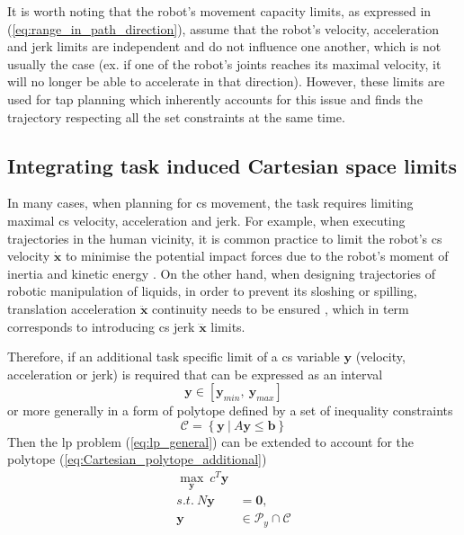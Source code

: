 It is worth noting that the robot's movement capacity limits, as expressed in (\ref{eq:range_in_path_direction}), assume that the robot's velocity, acceleration and jerk limits are independent and do not influence one another, which is not usually the case (ex. if one of the robot's joints reaches its maximal velocity, it will no longer be able to accelerate in that direction). However, these limits are used for \gls{tap} planning which inherently accounts for this issue and finds the trajectory respecting all the set constraints at the same time. 

\subsection{Integrating task induced Cartesian space limits}

In many cases, when planning for \gls{cs} movement, the task requires limiting maximal \gls{cs} velocity, acceleration and jerk. For example, when executing trajectories in the human vicinity, it is common practice to limit the robot's \gls{cs} velocity $\dot{\bm{x}}$ to minimise the potential impact forces due to the robot's moment of inertia \cite{smu} and kinetic energy \cite{joseph2020}.
On the other hand, when designing trajectories of robotic manipulation of liquids, in order to prevent its sloshing or spilling, translation acceleration $\ddot{\bm{x}}$ continuity needs to be ensured \cite{moriello2018}, which in term corresponds to introducing \gls{cs} jerk $\dddot{\bm{x}}$ limits.

Therefore, if an additional task specific limit of a \gls{cs} variable $\bm{y}$ (velocity, acceleration or jerk) is required that can be expressed as an interval
\begin{equation}
\bm{y}\in  [\bm{y}_{min},~\bm{y}_{max}]\label{eq:limits_cs_additional}
\end{equation}
or more generally in a form of polytope defined by a set of inequality constraints
\begin{equation}
\mathcal{C} = \left\{ \bm{y} ~|~ A \bm{y} \leq \bm{b} \right\}
\label{eq:Cartesian_polytope_additional}
\end{equation}
Then the \gls{lp} problem (\ref{eq:lp_general}) can be extended to account for the polytope (\ref{eq:Cartesian_polytope_additional})
\begin{equation}
\begin{split}
    \max_{\bm{y}} ~c^T \bm{y}& \\
    s.t. ~ N\bm{y} &= \bm{0}, \\
    \bm{y}&\in \mathcal{P}_y \cap \mathcal{C}
\end{split}\label{eq:lp_general_additional}
\end{equation}

